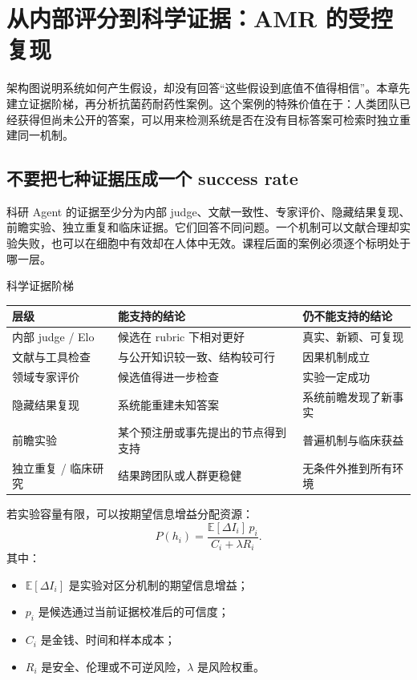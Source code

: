 \section{从内部评分到科学证据：AMR 的受控复现}

架构图说明系统如何产生假设，却没有回答“这些假设到底值不值得相信”。本章先建立证据阶梯，再分析抗菌药耐药性案例。这个案例的特殊价值在于：人类团队已经获得但尚未公开的答案，可以用来检测系统是否在没有目标答案可检索时独立重建同一机制。

\subsection{不要把七种证据压成一个 success rate}

科研 Agent 的证据至少分为内部 judge、文献一致性、专家评价、隐藏结果复现、前瞻实验、独立重复和临床证据。它们回答不同问题。一个机制可以文献合理却实验失败，也可以在细胞中有效却在人体中无效。课程后面的案例必须逐个标明处于哪一层。

\begin{importantbox}{科学证据阶梯}
\begin{tabularx}{\textwidth}{L{0.22\textwidth}X X}
\toprule
层级 & 能支持的结论 & 仍不能支持的结论 \\
\midrule
内部 judge / Elo & 候选在 rubric 下相对更好 & 真实、新颖、可复现 \\
文献与工具检查 & 与公开知识较一致、结构较可行 & 因果机制成立 \\
领域专家评价 & 候选值得进一步检查 & 实验一定成功 \\
隐藏结果复现 & 系统能重建未知答案 & 系统前瞻发现了新事实 \\
前瞻实验 & 某个预注册或事先提出的节点得到支持 & 普遍机制与临床获益 \\
独立重复 / 临床研究 & 结果跨团队或人群更稳健 & 无条件外推到所有环境 \\
\bottomrule
\end{tabularx}
\end{importantbox}

若实验容量有限，可以按期望信息增益分配资源：
$$
P(h_i)=\frac{\mathbb{E}[\Delta I_i]\,p_i}
{C_i+\lambda R_i}.
$$
其中：
\begin{itemize}
  \item $\mathbb{E}[\Delta I_i]$ 是实验对区分机制的期望信息增益；
  \item $p_i$ 是候选通过当前证据校准后的可信度；
  \item $C_i$ 是金钱、时间和样本成本；
  \item $R_i$ 是安全、伦理或不可逆风险，$\lambda$ 是风险权重。
\end{itemize}

